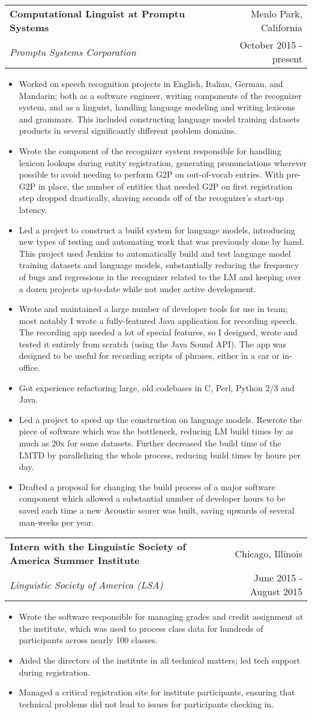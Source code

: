 \documentclass[letterpaper,10pt]{article}
\makeatletter
\newcommand{\resitem}[1]{
    \item #1 \vspace{-2pt}
}
\newcommand{\ressubheading}[4]{
    \begin{tabular*}{7in}{
        l@{\cftdotfill{\cftsecdotsep}\extracolsep{\fill}}r}
		    \textbf{#1} & #2 \\
		    \textit{#3} & #4 \\
    \end{tabular*}
    \vspace{-6pt}}
\makeatother
\begin{document}
\ressubheading{Computational Linguist at Promptu Systems}{Menlo Park, California}{Promptu Systems Corporation}{October 2015 - present}
\begin{itemize}
    \resitem{Worked on speech recognition projects in English, Italian, German, and Mandarin; both as a software engineer, writing components of the recognizer system, and as a linguist, handling language modeling and writing lexicons and grammars. This included constructing language model training datasets products in several significantly different problem domains.}
    \resitem{Wrote the component of the recognizer system responsible for handling lexicon lookups during entity registration, generating pronunciations wherever possible to avoid needing to perform G2P on out-of-vocab entries. With pre-G2P in place, the number of entities that needed G2P on first registration step dropped drastically, shaving seconds off of the recognizer's start-up latency.}
    \resitem{Led a project to construct a build system for language models, introducing new types of testing and automating work that was previously done by hand. This project used Jenkins to automatically build and test language model training datasets and language models, substantially reducing the frequency of bugs and regressions in the recognizer related to the LM and keeping over a dozen projects up-to-date while not under active development.}
    \resitem{Wrote and maintained a large number of developer tools for use in team; most notably I wrote a fully-featured Java application for recording speech. The recording app needed a lot of special features, so I designed, wrote and tested it entirely from scratch (using the Java Sound API). The app was designed to be useful for recording scripts of phrases, either in a car or in-office.}
    \resitem{Got experience refactoring large, old codebases in C, Perl, Python 2/3 and Java.}
    \resitem{Led a project to speed up the construction on language models. Rewrote the piece of software which was the bottleneck, reducing LM build times by as much as 20x for some datasets. Further decreased the build time of the LMTD by parallelizing the whole process, reducing build times by hours per day.}
    \resitem{Drafted a proposal for changing the build process of a major software component which allowed a substantial number of developer hours to be saved each time a new Acoustic scorer was built, saving upwards of several man-weeks per year.}
\end{itemize}

\ressubheading{Intern with the Linguistic Society of America Summer Institute}{Chicago, Illinois}{Linguistic Society of America (LSA)}{June 2015 - August 2015}
\begin{itemize}
	\resitem{Wrote the software responsible for managing grades and credit assignment at the institute, which was used to process class data for hundreds of participants across nearly 100 classes.} 
	\resitem{Aided the directors of the institute in all technical matters; led tech support during registration.}
	\resitem{Managed a critical registration site for institute participants, ensuring that technical problems did not lead to issues for participants checking in.}
\end{itemize}
\end{document}
